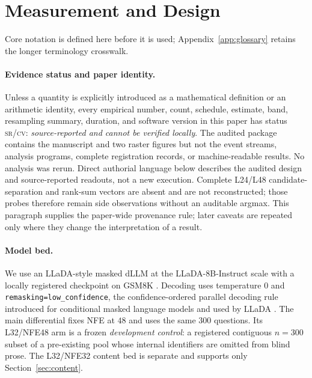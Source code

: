 \documentclass{article}
\newcommand{\srcv}{\textsc{sr/cv}}
\begin{document}
\section{Measurement and Design}\label{sec:method}

Core notation is defined here before it is used; Appendix~\ref{app:glossary}
retains the longer terminology crosswalk.

\begin{center}
\end{center}

\paragraph{Evidence status and paper identity.}
Unless a quantity is explicitly introduced as a mathematical definition or an
arithmetic identity, every empirical number, count, schedule, estimate, band,
resampling summary, duration, and software version in this paper has status
\srcv: \emph{source-reported and cannot be verified locally}.  The audited
package contains the manuscript and two raster figures but not the event streams,
analysis programs, complete registration records, or machine-readable results.
No analysis was rerun.  Direct authorial language below describes the audited
design and source-reported readouts, not a new execution.  Complete L24/L48
candidate-separation and rank-sum vectors are absent and are not reconstructed;
those probes therefore remain side observations without an auditable argmax.
This paragraph supplies the paper-wide provenance rule; later caveats are
repeated only where they change the interpretation of a result.

\paragraph{Model bed.}
We use an LLaDA-style masked dLLM at the LLaDA-8B-Instruct scale with a locally
registered checkpoint on GSM8K \citep{cobbe2021gsm8k}. Decoding uses temperature
$0$ and \texttt{remasking=low\_confidence}, the confidence-ordered parallel
decoding rule introduced for conditional masked language models and used by
LLaDA \citep{ghazvininejad2019maskpredict,nie2025large}. The main differential
fixes NFE at $48$ and uses the same $300$ questions. Its L32/NFE48 arm is a
frozen \emph{development control}: a registered contiguous $n{=}300$ subset of
a pre-existing pool whose internal identifiers are omitted from blind prose. The
L32/NFE32 content bed is separate and supports only Section~\ref{sec:content}.
\end{document}
